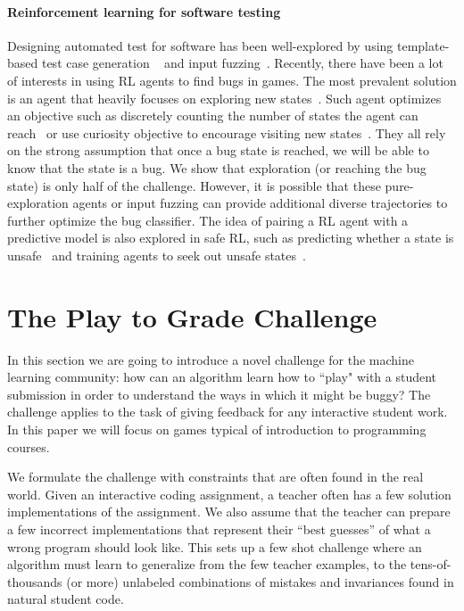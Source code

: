 \documentclass{article}
\newcommand{\EDIT}[1]{#1}%
\begin{document}
\EDIT{\paragraph{Reinforcement learning for software testing} Designing automated test for software has been well-explored by using template-based test case generation ~\cite{hu2011automating} and input fuzzing~\cite{aschermann2020ijon}. Recently, there have been a lot of interests in using RL agents to find bugs in games. The most prevalent solution is an agent that heavily focuses on exploring new states~\cite{mohamed2015variational,pathak2017curiosity,eysenbach2018diversity,ecoffet2019go}. Such agent optimizes an objective such as discretely counting the number of states the agent can reach~\cite{zheng2019wuji} or use curiosity objective to encourage visiting new states~\cite{zhan2018taking,gordillo2021improving}. They all rely on the strong assumption that once a bug state is reached, we will be able to know that the state is a bug. We show that exploration (or reaching the bug state) is only half of the challenge. However, it is possible that these pure-exploration agents or input fuzzing can provide additional diverse trajectories to further optimize the bug classifier. The idea of pairing a RL agent with a predictive model is also explored in safe RL, such as predicting whether a state is unsafe~\cite{saunders2017trial,uesato2018rigorous} and training agents to seek out unsafe states~\cite{prakash2019improving,reddy2020learning}.}



\section{The Play to Grade Challenge}
\vspace{-2mm} 

In this section we are going to introduce a novel challenge for the machine learning community: how can an algorithm learn how to ``play" with a student submission in order to understand the ways in which it might be buggy? The challenge applies to the task of giving feedback for any interactive student work. In this paper we will focus on games typical of introduction to programming courses. 

We formulate the challenge with constraints that are often found in the real world. Given an interactive coding assignment, a teacher often has  a few solution implementations of the assignment. We also assume that the teacher can prepare a few incorrect implementations that represent their ``best guesses'' of what a wrong program should look like. This sets up a few shot challenge where an algorithm must learn to generalize from the few teacher examples, to the tens-of-thousands (or more) unlabeled combinations of mistakes and invariances found in natural student code.
\end{document}
